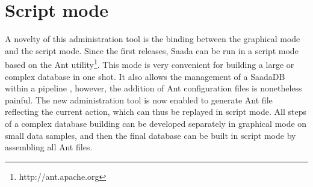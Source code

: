 \section{Script mode}
A novelty of this administration tool is the binding between the graphical mode and the script mode. Since the first releases, Saada can be run in a script mode based on the Ant utility\footnote{http://ant.apache.org}. This mode is very convenient for building a large or complex database in one shot. It also allows the management of a SaadaDB within a pipeline \citep{P03_adassxxii}, however, the addition of Ant configuration files is nonetheless painful. The new administration tool is now enabled to generate Ant file reflecting the current action, which can thus be replayed in script mode. All steps of a complex database building can be developed separately in graphical mode on small data samples, and then the final database can be built in script mode by assembling all Ant files.

